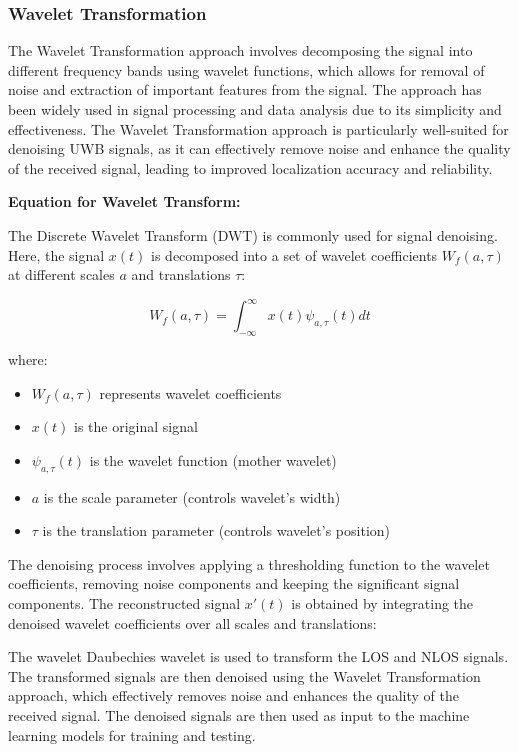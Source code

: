 \documentclass[
	article, %
	11pt, %
	draft, %
]{CSUniSchoolLabReport}
\begin{document}
\subsubsection{Wavelet Transformation}\label{wavelet_transformation}

The Wavelet Transformation approach involves decomposing the signal into different frequency bands using wavelet functions, which allows for removal of noise and extraction of important features from the signal. The approach has been widely used in signal processing and data analysis due to its simplicity and effectiveness. The Wavelet Transformation approach is particularly well-suited for denoising UWB signals, as it can effectively remove noise and enhance the quality of the received signal, leading to improved localization accuracy and reliability.

\textbf{Equation for Wavelet Transform:}

The Discrete Wavelet Transform (DWT) is commonly used for signal denoising. Here, the signal $x(t)$ is decomposed into a set of wavelet coefficients $W_f(a, \tau)$ at different scales $a$ and translations $\tau$:

\begin{equation}
W_f(a, \tau) = \int_{-\infty}^{\infty} x(t) \psi_{a, \tau}(t) dt
\end{equation}

where:

\begin{itemize}
  \item $W_f(a, \tau)$ represents wavelet coefficients
  \item $x(t)$ is the original signal
  \item $\psi_{a, \tau}(t)$ is the wavelet function (mother wavelet)
  \item $a$ is the scale parameter (controls wavelet's width)
  \item $\tau$ is the translation parameter (controls wavelet's position)
\end{itemize}

The denoising process involves applying a thresholding function to the wavelet coefficients, removing noise components and keeping the significant signal components. The reconstructed signal $x'(t)$ is obtained by integrating the denoised wavelet coefficients over all scales and translations:

The wavelet Daubechies wavelet is used to transform the LOS and NLOS signals. The transformed signals are then denoised using the Wavelet Transformation approach, which effectively removes noise and enhances the quality of the received signal. The denoised signals are then used as input to the machine learning models for training and testing.
\end{document}
